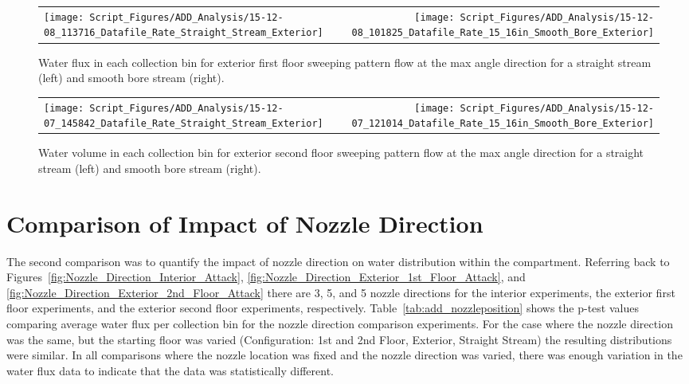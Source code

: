 \documentclass[12pt,oneside]{book}
\begin{document}
\begin{figure}[ht]
\begin{tabular*}{\textwidth}{lr}
\texttt{[image: Script\_Figures/ADD\_Analysis/15-12-08\_113716\_Datafile\_Rate\_Straight\_Stream\_Exterior]} &
\texttt{[image: Script\_Figures/ADD\_Analysis/15-12-08\_101825\_Datafile\_Rate\_15\_16in\_Smooth\_Bore\_Exterior]}
\end{tabular*}
\caption[Water Flux for Varying Exterior First Floor Sweeping Pattern Hose Stream Types]{Water flux in each collection bin for exterior first floor sweeping pattern flow at the max angle direction for a straight stream (left) and smooth bore stream (right).}
\label{fig:Exterior_FirstFloor_O_Varying_Nozzle}
\end{figure}

\begin{figure}[ht]
\begin{tabular*}{\textwidth}{lr}
\texttt{[image: Script\_Figures/ADD\_Analysis/15-12-07\_145842\_Datafile\_Rate\_Straight\_Stream\_Exterior]} &
\texttt{[image: Script\_Figures/ADD\_Analysis/15-12-07\_121014\_Datafile\_Rate\_15\_16in\_Smooth\_Bore\_Exterior]}
\end{tabular*}
\caption[Water Flux for Varying Exterior Second Floor Sweeping Pattern Hose Stream Types]{Water volume in each collection bin for exterior second floor sweeping pattern flow at the max angle direction for a straight stream (left) and smooth bore stream (right).}
\label{fig:Exterior_SecondFloor_O_Varying_Nozzle}
\end{figure}


\section{Comparison of Impact of Nozzle Direction}

The second comparison was to quantify the impact of nozzle direction on water distribution within the compartment. Referring back to Figures~\ref{fig:Nozzle_Direction_Interior_Attack}, \ref{fig:Nozzle_Direction_Exterior_1st_Floor_Attack}, and \ref{fig:Nozzle_Direction_Exterior_2nd_Floor_Attack} there are 3, 5, and 5 nozzle directions for the interior experiments, the exterior first floor experiments, and the exterior second floor experiments, respectively. Table~\ref{tab:add_nozzleposition} shows the p-test values comparing average water flux per collection bin  for the nozzle direction comparison experiments. For the case where the nozzle direction was the same, but the starting floor was varied (Configuration: 1st and 2nd Floor, Exterior, Straight Stream) the resulting distributions were similar. In all comparisons where the nozzle location was fixed and the nozzle direction was varied, there was enough variation in the water flux data to indicate that the data was statistically different. 
\end{document}
